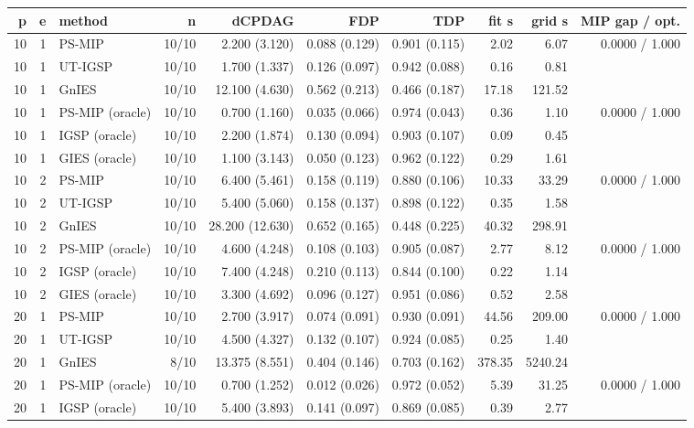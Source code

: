 \begingroup
\small
\setlength{\tabcolsep}{3pt}
\begin{tabular}{@{}rrlrrrrrrr@{}}
\hline
p & e & method & n & dCPDAG & FDP & TDP & fit s & grid s & MIP gap / opt. \\
\hline
10 & 1 & PS-MIP & 10/10 & 2.200 (3.120) & 0.088 (0.129) & 0.901 (0.115) & 2.02 & 6.07 & 0.0000 / 1.000 \\
10 & 1 & UT-IGSP & 10/10 & 1.700 (1.337) & 0.126 (0.097) & 0.942 (0.088) & 0.16 & 0.81 &  \\
10 & 1 & GnIES & 10/10 & 12.100 (4.630) & 0.562 (0.213) & 0.466 (0.187) & 17.18 & 121.52 &  \\
10 & 1 & PS-MIP (oracle) & 10/10 & 0.700 (1.160) & 0.035 (0.066) & 0.974 (0.043) & 0.36 & 1.10 & 0.0000 / 1.000 \\
10 & 1 & IGSP (oracle) & 10/10 & 2.200 (1.874) & 0.130 (0.094) & 0.903 (0.107) & 0.09 & 0.45 &  \\
10 & 1 & GIES (oracle) & 10/10 & 1.100 (3.143) & 0.050 (0.123) & 0.962 (0.122) & 0.29 & 1.61 &  \\
10 & 2 & PS-MIP & 10/10 & 6.400 (5.461) & 0.158 (0.119) & 0.880 (0.106) & 10.33 & 33.29 & 0.0000 / 1.000 \\
10 & 2 & UT-IGSP & 10/10 & 5.400 (5.060) & 0.158 (0.137) & 0.898 (0.122) & 0.35 & 1.58 &  \\
10 & 2 & GnIES & 10/10 & 28.200 (12.630) & 0.652 (0.165) & 0.448 (0.225) & 40.32 & 298.91 &  \\
10 & 2 & PS-MIP (oracle) & 10/10 & 4.600 (4.248) & 0.108 (0.103) & 0.905 (0.087) & 2.77 & 8.12 & 0.0000 / 1.000 \\
10 & 2 & IGSP (oracle) & 10/10 & 7.400 (4.248) & 0.210 (0.113) & 0.844 (0.100) & 0.22 & 1.14 &  \\
10 & 2 & GIES (oracle) & 10/10 & 3.300 (4.692) & 0.096 (0.127) & 0.951 (0.086) & 0.52 & 2.58 &  \\
20 & 1 & PS-MIP & 10/10 & 2.700 (3.917) & 0.074 (0.091) & 0.930 (0.091) & 44.56 & 209.00 & 0.0000 / 1.000 \\
20 & 1 & UT-IGSP & 10/10 & 4.500 (4.327) & 0.132 (0.107) & 0.924 (0.085) & 0.25 & 1.40 &  \\
20 & 1 & GnIES & 8/10 & 13.375 (8.551) & 0.404 (0.146) & 0.703 (0.162) & 378.35 & 5240.24 &  \\
20 & 1 & PS-MIP (oracle) & 10/10 & 0.700 (1.252) & 0.012 (0.026) & 0.972 (0.052) & 5.39 & 31.25 & 0.0000 / 1.000 \\
20 & 1 & IGSP (oracle) & 10/10 & 5.400 (3.893) & 0.141 (0.097) & 0.869 (0.085) & 0.39 & 2.77 &  \\

\end{tabular}

